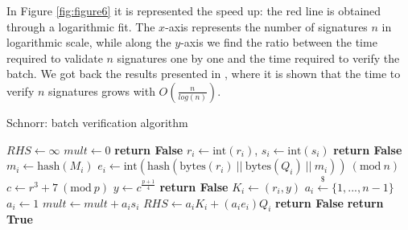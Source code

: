 \bigskip
\noindent
In Figure \ref{fig:figure6} it is represented the speed up: the red line is obtained through a logarithmic fit. The $x$-axis represents the number of signatures $n$ in logarithmic scale, while along the $y$-axis we find the ratio between the time required to validate $n$ signatures one by one and the time required to verify the batch. We got back the results presented in \cite{RefWork:5}, where it is shown that the time to verify $n$ signatures grows with $O\left(\frac{n}{log(n)}\right)$.

\begin{algorithm}
	\caption{Schnorr: batch verification algorithm}
	\label{alg:schnorr_batch}
	\begin{algorithmic}[1]
		\State $RHS \gets \infty$
		\State $mult \gets 0$
		\State \textbf{return False}
		\EndIf
		\State $r_i \gets \text{int}(r_i)$, $s_i \gets \text{int}(s_i)$
		\State \textbf{return False}
		\EndIf
		\State $m_i \gets \text{hash}(M_i)$
		\State $e_i \gets \text{int}(\text{hash}(\text{bytes}(r_i) \ || \ \text{bytes}(Q_i) \ || \ m_i)) \ (\text{mod} \ n)$
		\State $c \gets r^3 + 7 \ (\text{mod} \ p)$
		\State $y \gets c^{\frac{p + 1}{4}}$
		\State \textbf{return False}
		\EndIf
		\State $K_i \gets (r_i, y)$
		\State  $a_i \xleftarrow{\text{\$}} \{1, ..., n - 1\}$ 
		\Else
		\State $a_i \gets 1$
		\EndIf
		\State $mult \gets mult + a_is_i$
		\State $RHS \gets a_iK_i + (a_ie_i)Q_i$
		\EndFor
		\State \textbf{return False}
		\EndIf
		\State \textbf{return True}
		\EndProcedure	
	\end{algorithmic}
\end{algorithm}
